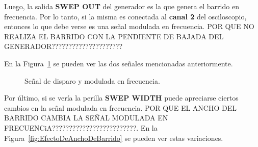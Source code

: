     Luego, la salida \textbf{SWEP OUT} del generador es la que genera el barrido en frecuencia. Por lo tanto, si la misma
    es conectada al \textbf{canal 2} del osciloscopio, entonces lo que debe verse es una señal modulada en frecuencia. POR QUE
    NO REALIZA EL BARRIDO CON LA PENDIENTE DE BAJADA DEL GENERADOR?????????????????????

    En la Figura~\ref{fig:SeñalDisparoySeñalFM} se pueden ver las dos señales mencionadas anteriormente.

    \begin{figure}[H]
      \centering
      \caption{Señal de disparo y modulada en frecuencia.}
      \label{fig:SeñalDisparoySeñalFM}
    \end{figure}

    Por último, si se vería la perilla \textbf{SWEP WIDTH} puede apreciarse ciertos cambios en la señal modulada en frecuencia.
    POR QUE EL ANCHO DEL BARRIDO CAMBIA LA SEÑAL MODULADA EN FRECUENCiA?????????????????????????. En la 
    Figura~\ref{fig:EfectoDeAnchoDeBarrido} se pueden ver estas variaciones.


